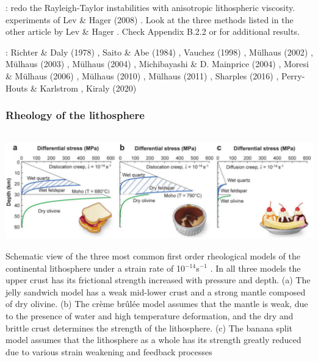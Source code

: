 \mscthesis{}: redo the Rayleigh-Taylor instabilities with 
anisotropic lithospheric viscosity.
experiments of Lev \& Hager (2008) \cite{leha08}. Look at the three methods 
listed in the other article by 
Lev \& Hager \cite{leha08b}. 
Check Appendix B.2.2 or \cite{perr19} for additional results.

\Literature: 
Richter \& Daly (1978) \cite{rida78},
Saito \& Abe (1984) \cite{saab84},
Vauchez \etal (1998) \cite{vatb98},
M{\"u}lhaus \etal (2002) \cite{mumh02},
M{\"u}lhaus \etal (2003) \cite{mumc03},
M{\"u}lhaus \etal (2004) \cite{mumc04},
Michibayashi \& D. Mainprice (2004) \cite{mima04},
Moresi \& M{\"u}lhaus (2006) \cite{momu06},
M{\"u}lhaus \etal (2010) \cite{mumg10},
M{\"u}lhaus \etal (2011) \cite{muso11},
Sharples \etal (2016) \cite{shmv16},
Perry-Houts \& Karlstrom \cite{peka18},
Kiraly \etal (2020) \cite{kich20}

\subsubsection{Rheology of the lithosphere}

\begin{center}
\includegraphics[height=5cm]{images/rheology/budr08}\\
{\captionfont Schematic view of the three most common first order rheological models of the continental 
lithosphere under a strain rate of 10$^{-14}$s$^{-1}$ . 
In all three models the upper crust has its frictional strength increased with pressure and depth. 
(a) The jelly sandwich model has a weak mid-lower crust and a strong mantle composed of dry olivine. 
(b) The cr\`eme br\^ul\'ee model assumes that the mantle is weak, due to the presence of water and high 
temperature deformation, and the dry and brittle crust determines the strength of the lithosphere. 
(c) The banana split model assumes that the lithosphere as a whole has its strength greatly reduced
due to various strain weakening and feedback processes \cite{budr08}}
\end{center}

